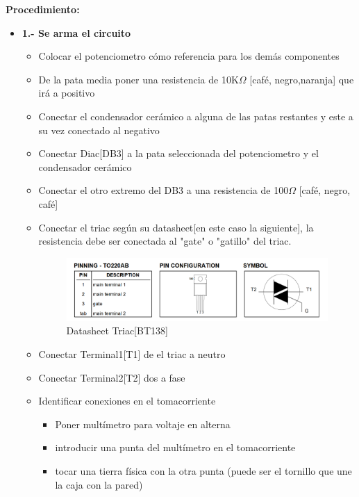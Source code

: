 \documentclass[letterpaper]{article}
\begin{document}
\begin{LARGE}
\textbf{Procedimiento:}\\
\end{LARGE}

\begin{itemize}
    \item \textbf{1.- Se arma el circuito}
    \begin{itemize}
        \item Colocar el potenciometro cómo referencia para los demás componentes 
        \item De la pata media poner una resistencia de 10K$\Omega$ [café, negro,naranja] que irá a positivo
        \item Conectar el condensador cerámico a alguna de las patas restantes y este a su vez conectado al negativo
        \item Conectar Diac[DB3] a la pata seleccionada del potenciometro y el condensador cerámico 
        \item Conectar el otro extremo del DB3 a una resistencia de 100$\Omega$ [café, negro, café]
        \item Conectar el triac según su datasheet[en este caso la siguiente], la resistencia debe ser conectada al "gate" o "gatillo" del triac.
        \begin{figure}[htbp]
            \centering
            \includegraphics[width=15cm]{img/triacdatasheet.PNG}
            \caption{Datasheet Triac[BT138]}
            \label{fig:my_label}
        \end{figure}
        \item Conectar Terminal1[T1] de el triac a neutro
        \item Conectar Terminal2[T2] dos a fase 
        \item Identificar conexiones en el tomacorriente
            \begin{itemize}
                \item Poner multímetro para voltaje en alterna
                \item introducir una punta del multímetro en el tomacorriente
                \item tocar una tierra física con la otra punta (puede ser el tornillo que une la caja con la pared)

\end{itemize}
\end{itemize}
\end{itemize}
\end{document}
